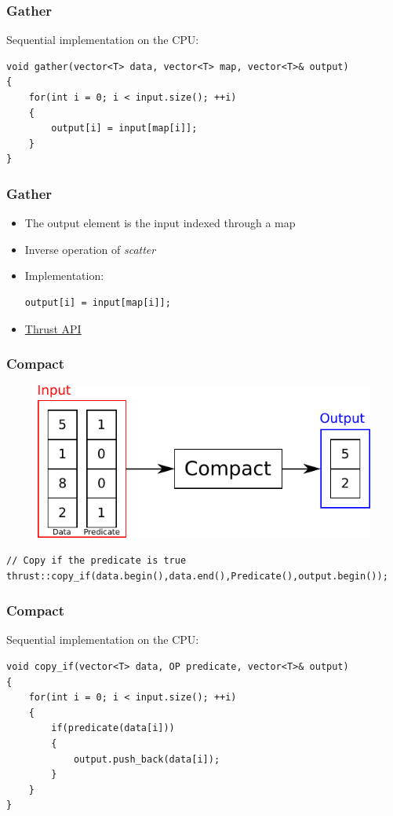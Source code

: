 \documentclass[aspectratio=169]{beamer}
\begin{document}
\begin{frame}[fragile]
	\frametitle{Gather}
	Sequential implementation on the CPU:
\begin{lstlisting}
void gather(vector<T> data, vector<T> map, vector<T>& output)
{
	for(int i = 0; i < input.size(); ++i)
	{
		output[i] = input[map[i]];
	}
}
\end{lstlisting}
\end{frame}

\begin{frame}[fragile]
\frametitle{Gather}
\begin{itemize}
	\item The output element is the input indexed through a map
	\item<2-> Inverse operation of \textit{scatter}
	\item<3-> Implementation:


\begin{lstlisting}
output[i] = input[map[i]];
\end{lstlisting}
		\item<3-> \href{https://thrust.github.io/doc/group__gathering.html}{Thrust API}
\end{itemize} 
\end{frame}


\begin{frame}[fragile]
\frametitle{Compact}
\begin{figure}
	\centering
	\includegraphics[height=0.6\textheight]{o_compact}
\end{figure}
\begin{lstlisting}
// Copy if the predicate is true
thrust::copy_if(data.begin(),data.end(),Predicate(),output.begin());
\end{lstlisting}
\end{frame}


\begin{frame}[fragile]
	\frametitle{Compact}
	Sequential implementation on the CPU:
\begin{lstlisting}
void copy_if(vector<T> data, OP predicate, vector<T>& output)
{
	for(int i = 0; i < input.size(); ++i)
	{
		if(predicate(data[i]))
		{
			output.push_back(data[i]);
		}
	}
}
\end{lstlisting}
\end{frame}
\end{document}
